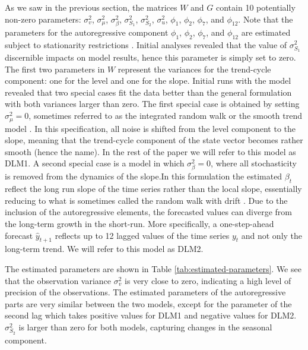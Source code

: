 \documentclass[12pt, a4paper]{article}
\begin{document}
As we saw in the previous section, the matrices $W$ and $G$ contain 10 potentially non-zero parameters: $\sigma_{v}^{2}$, $\sigma_{\mu}^{2}$, $\sigma_{\beta}^{2}$, $\sigma_{S_{1}}^{2}$, $\sigma_{S_{2}}^{2}$, $\sigma^{2}_{u}$, $\phi_{1}$, $\phi_{2}$, $\phi_{7}$, and
$\phi_{12}$. Note that the parameters for the autoregressive
component $\phi_{1}$, $\phi_{2}$, $\phi_{7}$, and $\phi_{12}$ are estimated subject to stationarity restrictions \citep{monahan1984note}. Initial analyses revealed that the value of $\sigma_{S_{1}}^{2}$ discernible impacts on model results, hence this parameter is simply set to zero. The first two parameters in $W$ represent the variances for the trend-cycle component: one for the level and one for the
slope. Initial runs with the model revealed that two
special cases fit the data better than the general formulation with both variances larger than zero. The
first special case is obtained by setting $\sigma^{2}_{\mu} = 0$,
sometimes referred to as the integrated random walk or the smooth trend
model \citep{young1991recursive}. In this specification, all noise is shifted from the level component to the slope,
meaning that the trend-cycle component of the state vector becomes rather smooth (hence the
name). In the rest of the paper we will refer to this model as DLM1. A
second special case is a model in which $\sigma^{2}_{\beta} = 0$,
where all stochasticity is removed from the dynamics of the slope.In
this formulation the estimated $\beta_{t}$ reflect the long run slope
of the time series rather than the local slope, essentially reducing to what is sometimes called the random walk with drift \citep{koopman2012forecasting}. Due to the inclusion of the autoregressive elements, the forecasted
values can diverge from the long-term growth in the short-run. More
specifically, a one-step-ahead forecast $\hat{y}_{t + 1}$ reflects up
to 12 lagged values of the time series $y_{t}$ and not only the long-term trend. We will refer to this model as DLM2. 

The estimated parameters are shown in Table
\ref{tab:estimated-parameters}.  We see that the observation variance
$\sigma_{v}^{2}$ is very close to zero, indicating a high level of
precision of the observations. The estimated parameters of the autoregressive parts are very similar between the two models, except for the parameter of the second lag which takes positive values for DLM1 and negative values for DLM2. $\sigma_{S_{2}}^{2}$ is larger than zero for both models, capturing changes in the seasonal component.
\end{document}
